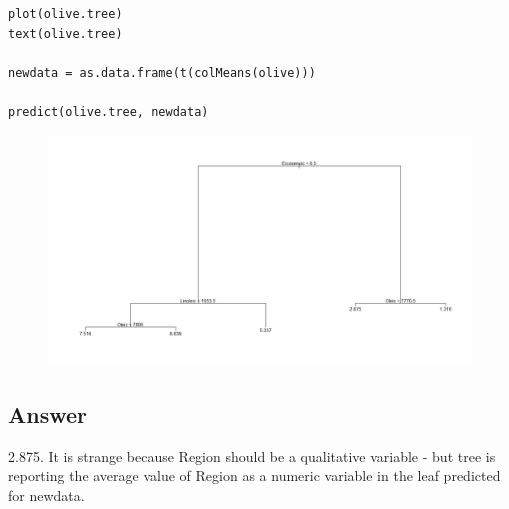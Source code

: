 \documentclass[caret-main.tex]{subfiles}
\begin{document}
\newpage
\begin{framed}
\begin{verbatim}
plot(olive.tree)
text(olive.tree)

newdata = as.data.frame(t(colMeans(olive)))

predict(olive.tree, newdata)

\end{verbatim}
\end{framed}
\begin{figure}
\centering
\includegraphics[width=0.95\linewidth]{./DAquiz6q4a}
\caption{}
\label{fig:DAquiz6q4a}
\end{figure}
\subsection*{Answer}
2.875. It is strange because Region should be a qualitative variable - but tree is reporting the average value of Region as a numeric variable in the leaf predicted for newdata.

\newpage
\end{document}
